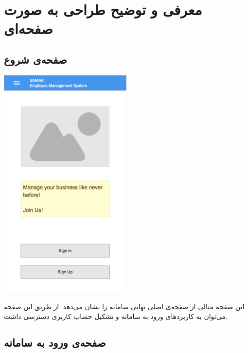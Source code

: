 
\section{معرفی و توضیح طراحی به صورت صفحه‌ای}

\subsection{صفحه‌ی شروع}





\begin{center}
\includegraphics[width = 0.5\textwidth]{images/1-main-page.png}
\end{center}

این صفحه مثالی از صفحه‌ی اصلی نهایی سامانه را نشان می‌دهد.
از طریق این صفحه می‌توان به کاربرد‌های ورود به سامانه و تشکیل حساب کاربری دسترسی داشت.

\subsection{صفحه‌ی ورود به سامانه}


